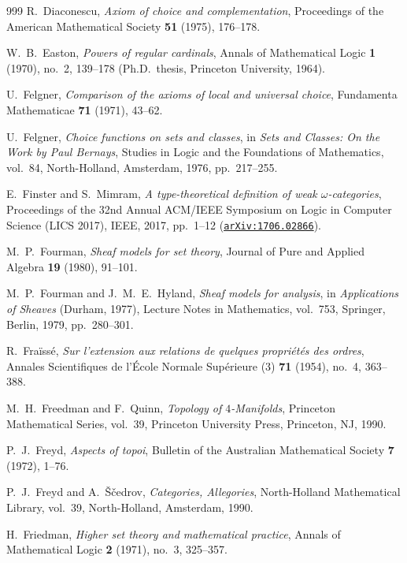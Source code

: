 \documentclass[10pt,twoside,openright]{book}
\theoremstyle{crmplain}
\theoremstyle{crmdef}
\theoremstyle{crmremark}
\begin{document}
\begin{thebibliography}{999}
R.~Diaconescu,
\emph{Axiom of choice and complementation},
Proceedings of the American Mathematical Society \textbf{51} (1975), 176--178.

W.~B.~Easton,
\emph{Powers of regular cardinals},
Annals of Mathematical Logic \textbf{1} (1970), no.~2, 139--178 (Ph.D.\ thesis, Princeton University, 1964).

U.~Felgner,
\emph{Comparison of the axioms of local and universal choice},
Fundamenta Mathematicae \textbf{71} (1971), 43--62.

U.~Felgner,
\emph{Choice functions on sets and classes},
in \emph{Sets and Classes: On the Work by Paul Bernays}, Studies in Logic and the Foundations of Mathematics, vol.~84, North-Holland, Amsterdam, 1976, pp.~217--255.

E.~Finster and S.~Mimram,
\emph{A type-theoretical definition of weak $\omega$-categories},
Proceedings of the 32nd Annual ACM/IEEE Symposium on Logic in Computer Science (LICS 2017), IEEE, 2017, pp.~1--12 (\href{https://arxiv.org/abs/1706.02866}{\texttt{arXiv:1706.02866}}).

M.~P.~Fourman,
\emph{Sheaf models for set theory},
Journal of Pure and Applied Algebra \textbf{19} (1980), 91--101.

M.~P.~Fourman and J.~M.~E.~Hyland,
\emph{Sheaf models for analysis},
in \emph{Applications of Sheaves} (Durham, 1977), Lecture Notes in Mathematics, vol.~753, Springer, Berlin, 1979, pp.~280--301.

R.~Fra\"iss\'e,
\emph{Sur l'extension aux relations de quelques propri\'et\'es des ordres},
Annales Scientifiques de l'\'Ecole Normale Sup\'erieure (3) \textbf{71} (1954), no.~4, 363--388.

M.~H.~Freedman and F.~Quinn,
\emph{Topology of $4$-Manifolds},
Princeton Mathematical Series, vol.~39, Princeton University Press, Princeton, NJ, 1990.

P.~J.~Freyd,
\emph{Aspects of topoi},
Bulletin of the Australian Mathematical Society \textbf{7} (1972), 1--76.

P.~J.~Freyd and A.~\v{S}\v{c}edrov,
\emph{Categories, Allegories},
North-Holland Mathematical Library, vol.~39, North-Holland, Amsterdam, 1990.

H.~Friedman,
\emph{Higher set theory and mathematical practice},
Annals of Mathematical Logic \textbf{2} (1971), no.~3, 325--357.


\end{thebibliography}
\end{document}
